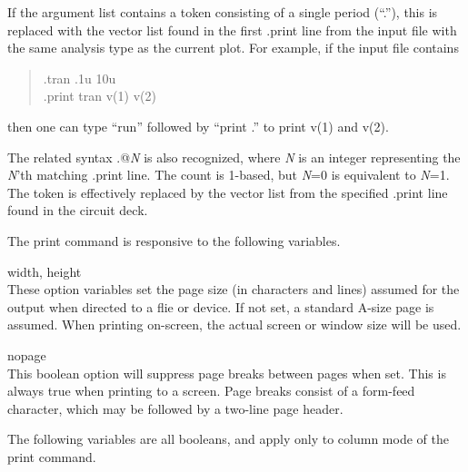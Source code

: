 If the argument list contains a token consisting of a single period
(``.''), this is replaced with the vector list found in the first {\vt
.print} line from the input file with the same analysis type as the
current plot.  For example, if the input file contains
\begin{quote}\vt
    .tran .1u 10u\\
    .print tran v(1) v(2)\\
\end{quote}
then one can type ``{\vt run}'' followed by ``{\vt print .}'' to print
{\vt v(1)} and {\vt v(2)}.

The related syntax {\vt .@}{\it N} is also recognized, where {\it N}
is an integer representing the {\it N\/}'th matching {\vt .print} line. 
The count is 1-based, but {\it N\/}=0 is equivalent to {\it N\/}=1. 
The token is effectively replaced by the vector list from the
specified {\vt .print} line found in the circuit deck.

The print command is responsive to the following variables.

\begin{description}
\item{{\et width}, {\et height}}\\
These option variables set the page size (in characters and lines)
assumed for the output when directed to a flie or device.  If not set,
a standard A-size page is assumed.  When printing on-screen, the
actual screen or window size will be used.

\item{\et nopage}\\
This boolean option will suppress page breaks between pages when set. 
This is always true when printing to a screen.  Page breaks consist of
a form-feed character, which may be followed by a two-line page
header.
\end{description}

The following variables are all booleans, and apply only to column
mode of the {\cb print} command.

